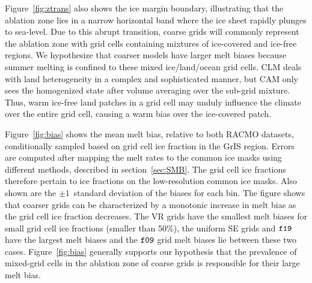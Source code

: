 \documentclass[draft]{agujournal2019}
\begin{document}
Figure~\ref{fig:ztrans} also shows the ice margin boundary, illustrating that the ablation zone lies in a narrow horizontal band where the ice sheet rapidly plunges to sea-level. Due to this abrupt transition, coarse grids will commonly represent the ablation zone with grid cells containing mixtures of ice-covered and ice-free regions. We hypothesize that coarser models have larger melt biases because summer melting is confined to these mixed ice/land/ocean grid cells. CLM deals with land heterogeneity in a complex and sophisticated manner, but CAM only sees the homogenized state after volume averaging over the sub-grid mixture. Thus, warm ice-free land patches in a grid cell may unduly influence the climate over the entire grid cell, causing a warm bias over the ice-covered patch.

Figure~\ref{fig:bias} shows the mean melt bias, relative to both RACMO datasets, conditionally sampled based on grid cell ice fraction in the GrIS region. Errors are computed after mapping the melt rates to the common ice masks using different methods, described in section~\ref{sec:SMB}. The grid cell ice fractions therefore pertain to ice fractions on the low-resolution common ice masks. Also shown are the $\pm 1$~standard deviation of the biases for each bin. The figure shows that coarser grids can be characterized by a monotonic increase in melt bias as the grid cell ice fraction decreases. The VR grids have the smallest melt biases for small grid cell ice fractions (smaller than 50\%), the uniform SE grids and $\tt f19$ have the largest melt biases and the $\tt f09$ grid melt biases lie between these two cases. Figure~\ref{fig:bias} generally supports our hypothesis that the prevalence of mixed-grid cells in the ablation zone of coarse grids is responsible for their large melt bias.
\end{document}
